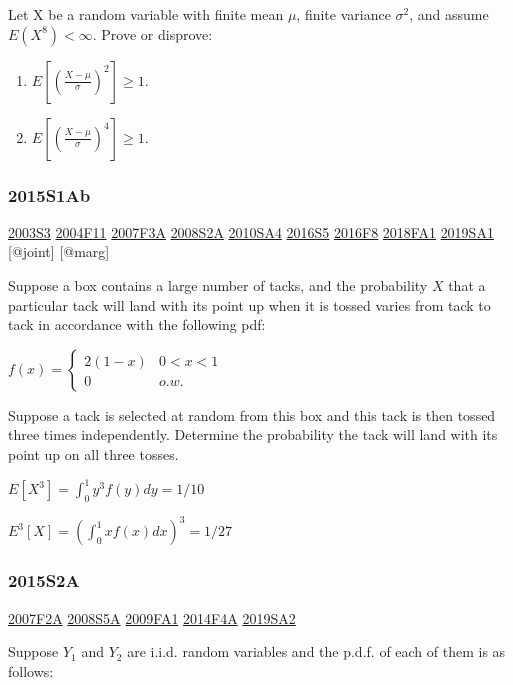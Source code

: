 \documentclass[6pt,Portrait]{article}
\begin{document}
Let X be a random variable with finite mean \(\mu\), finite variance
\(\sigma^2\), and assume \(E(X^8)<\infty\). Prove or disprove:

\begin{enumerate}
\def\labelenumi{\roman{enumi}.}
\item
  \(E[(\frac{X-\mu}{\sigma})^2]\ge1\).
\item
  \(E[(\frac{X-\mu}{\sigma})^4]\ge1\).
\end{enumerate}

\hypertarget{s1ab}{%
\subsubsection{2015S1Ab}\label{s1ab}}

\protect\hyperlink{s3}{2003S3} \protect\hyperlink{f11}{2004F11}
\protect\hyperlink{f3a}{2007F3A} \protect\hyperlink{s2a}{2008S2A}
\protect\hyperlink{sa4-1}{2010SA4} \protect\hyperlink{s5-4}{2016S5}
\protect\hyperlink{f8-4}{2016F8} \protect\hyperlink{fa1-4}{2018FA1}
\protect\hyperlink{sa1-3}{2019SA1} {[}@joint{]} {[}@marg{]}

Suppose a box contains a large number of tacks, and the probability
\(X\) that a particular tack will land with its point up when it is
tossed varies from tack to tack in accordance with the following pdf:

\(f(x)=\begin{cases}2(1-x)&0<x<1\\0& o.w.\end{cases}\)

Suppose a tack is selected at random from this box and this tack is then
tossed three times independently. Determine the probability the tack
will land with its point up on all three tosses.

 \(E[X^3]=\int_0^1y^3f(y)dy=1/10\)

\(E^3[X]=(\int_0^1xf(x)dx)^3=1/27\)

\hypertarget{s2a-1}{%
\subsubsection{2015S2A}\label{s2a-1}}

\protect\hyperlink{f2a}{2007F2A} \protect\hyperlink{s5a}{2008S5A}
\protect\hyperlink{fa1}{2009FA1} \protect\hyperlink{f4a-1}{2014F4A}
\protect\hyperlink{sa2-3}{2019SA2}

Suppose \(Y_1\) and \(Y_2\) are i.i.d. random variables and the p.d.f.
of each of them is as follows:
\end{document}
